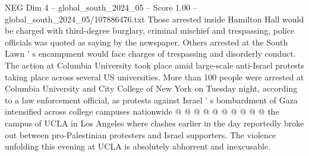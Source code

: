 \begin{textsample}{NEG Dim 4 – global\_south\_2024\_05 – Score 1.00 – global\_south\_2024\_05/107886476.txt}
Those arrested inside Hamilton Hall would be charged with third-degree burglary, criminal mischief and trespassing, police officials was quoted as saying by the newspaper.
Others arrested at the South Lawn ' s encampment would face charges of trespassing and disorderly conduct.
The action at Columbia University took place amid large-scale anti-Israel protests taking place across several US universities.
More than 100 people were arrested at Columbia University and City College of New York on Tuesday night, according to a law enforcement official, as protests against Israel ' s bombardment of Gaza intensified across college campuses nationwide @ @ @ @ @ @ @ @ @ @ the campus of UCLA in Los Angeles where clashes earlier in the day reportedly broke out between pro-Palestinian protesters and Israel supporters.
The violence unfolding this evening at UCLA is absolutely abhorrent and inexcusable.

\end{textsample}
